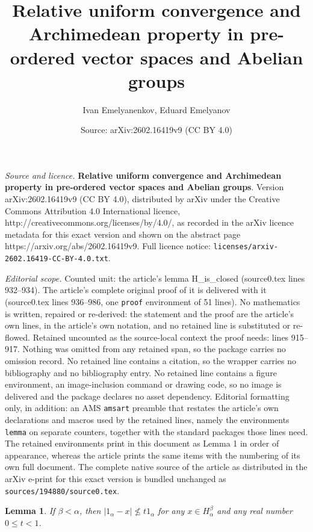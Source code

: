 \documentclass[10pt,a4paper]{amsart}
\title{{\bf Relative uniform convergence and Archimedean property in pre-ordered vector spaces and Abelian groups}}
\author{Ivan Emelyanenkov, Eduard Emelyanov}
\date{Source: arXiv:2602.16419v9 (CC BY 4.0)}
\newtheorem{lemma}{Lemma}
\renewcommand{\a}{\alpha}
\renewcommand{\b}{\beta}
\begin{document}
\maketitle

\noindent\emph{Source and licence.} {\bf Relative uniform convergence and Archimedean property in pre-ordered vector spaces and Abelian groups}. Version arXiv:2602.16419v9 (CC BY 4.0), distributed by arXiv under the Creative Commons Attribution 4.0 International licence, http://creativecommons.org/licenses/by/4.0/, as recorded in the arXiv licence metadata for this exact version and shown on the abstract page https://arxiv.org/abs/2602.16419v9. Full licence notice: \texttt{licenses/arxiv-2602.16419-CC-BY-4.0.txt}.\par\smallskip

\noindent\textit{Editorial scope.} Counted unit: the article's lemma H\_is\_closed (source0.tex lines 932--934). The article's complete original proof of it is delivered with it (source0.tex lines 936--986, one \texttt{proof} environment of 51 lines). No mathematics is written, repaired or re-derived: the statement and the proof are the article's own lines, in the article's own notation, and no retained line is substituted or re-flowed.  Retained uncounted as the source-local context the proof needs: lines 915--917.  Nothing was omitted from any retained span, so the package carries no omission record.  No retained line contains a citation, so the wrapper carries no bibliography and no bibliography entry.  No retained line contains a figure environment, an image-inclusion command or drawing code, so no image is delivered and the package declares no asset dependency.  Editorial formatting only, in addition: an AMS \texttt{amsart} preamble that restates the article's own declarations and macros used by the retained lines, namely the environments \texttt{lemma} on separate counters, together with the standard packages those lines need.  The retained environments print in this document as Lemma 1 in order of appearance, whereas the article prints the same items with the numbering of its own full document.  The complete native source of the article as distributed in the arXiv e-print for this exact version is bundled unchanged as \texttt{sources/194880/source0.tex}.
\begin{lemma}\label{there_is_gap}
If $ \b < \a $, then $| 1_\a - x | \not\leqslant t 1_\a$ for any $ x \in H_\a^\b $ and any real number $ 0 \leqslant t < 1 $.
\end{lemma}
\end{document}
